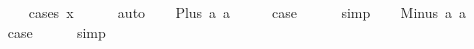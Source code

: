 \begin{isabellebody}
\ \ \ \ \isamarkupfalse%
\ {\isacharparenleft}cases\ x{\isacharparenright}\isanewline
\ \ \ \ \isamarkupfalse%
\ auto\isanewline
{}\isamarkupfalse%
\isanewline
\ \ \isamarkupfalse%
\ {\isacharparenleft}Plus\ a{}\ a{}{\isacharparenright}\isanewline
\ \ \isamarkupfalse%
\ \isamarkupfalse%
\ {\isacharquery}case\isanewline
\ \ \ \ \isamarkupfalse%
\ simp\isanewline
{}\isamarkupfalse%
\isanewline
\ \ \isamarkupfalse%
\ {\isacharparenleft}Minus\ a{}\ a{}{\isacharparenright}\isanewline
\ \ \isamarkupfalse%
\ \isamarkupfalse%
\ {\isacharquery}case\isanewline
\ \ \ \ \isamarkupfalse%
\ simp\isanewline
{}\isamarkupfalse%
%
\endisatagproof
{\isafoldproof}%
%
\isadelimproof
\isanewline
%
\endisadelimproof
%
\isadelimtheory
\isanewline
%
\endisadelimtheory
%
\isatagtheory
{}\isamarkupfalse%
%
\endisatagtheory
{\isafoldtheory}%
%
\isadelimtheory
%
\endisadelimtheory
%
\end{isabellebody}%
\endinput
